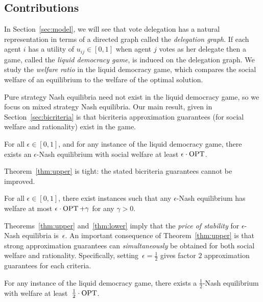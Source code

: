 

\subsection{Contributions}

In Section~\ref{sec:model}, we will see that vote delegation has a natural representation in terms of a 
directed graph called the {\em delegation graph}. If each agent $i$ has a utility of $u_{ij}\in [0,1]$ when agent $j$ 
votes as her delegate then a game, called the {\em liquid democracy game}, is induced on the delegation graph.
We study the {\em welfare ratio} in the liquid democracy game, which compares the social welfare of an equilibrium 
to the welfare of the optimal solution.

Pure strategy Nash equilibria need not exist in the liquid democracy game, so we focus on mixed 
strategy Nash equilibria.
Our main result, given in Section~\ref{sec:bicriteria} is that bicriteria approximation guarantees (for social welfare and rationality) 
exist in the game.
\begin{thm}\label{thm:upper}
For all $\epsilon\in [0,1]$, and for any instance of the liquid democracy game, there exists an $\epsilon$-Nash equilibrium with social 
welfare at least $\epsilon\cdot \operatorname{OPT}$.
\end{thm}
Theorem~\ref{thm:upper} is tight: the stated bicriteria guarantees cannot be improved.
\begin{thm}\label{thm:lower}
For all $\epsilon\in[0,1]$, there exist instances such that any $\epsilon$-Nash equilibrium has welfare at most $\epsilon\cdot \operatorname{OPT} +\gamma$ for any $\gamma>0$.
\end{thm}

Theorems~\ref{thm:upper} and~\ref{thm:lower} imply
that the {\em price of stability} for $\epsilon$-Nash equilibria is~$\epsilon$.
An important consequence of Theorem~\ref{thm:upper} is that strong approximation guarantees can {\em simultaneously}
be obtained for both social welfare and rationality.
Specifically, setting~$\epsilon=\frac12$ gives factor $2$ approximation guarantees for each criteria.
\begin{cor} \label{cor:upper} 
For any instance of the liquid democracy game, there exists a $\frac12$-Nash equilibrium with welfare at least~$\frac12\cdot \operatorname{OPT}$.
\end{cor}



